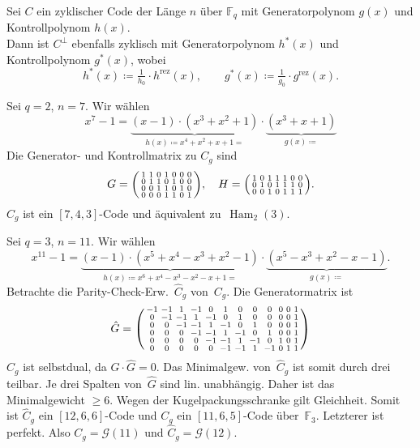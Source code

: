 \documentclass{cheat-sheet}
\newcommand{\F}{\mathbb{F}} %
\DeclareMathOperator{\Ham}{Ham} %
\newcommand{\Golay}{\mathcal{G}} %
\newcommand{\rez}{\mathrm{rez}} %
\begin{document}
\begin{satz}
  Sei $C$ ein zyklischer Code der Länge $n$ über $\F_q$ mit Generatorpolynom $g(x)$ und Kontrollpolynom $h(x)$. \\
  Dann ist $C^\perp$ ebenfalls zyklisch mit Generatorpolynom $h^*(x)$ und Kontrollpolynom $g^*(x)$, wobei
  \[
    h^*(x) \coloneqq \tfrac{1}{h_0} \cdot h^\rez(x), \qquad
    g^*(x) \coloneqq \tfrac{1}{g_0} \cdot g^\rez(x).
  \]
\end{satz}

\begin{bsp}
  Sei $q=2$, $n=7$.
  Wir wählen
  \[
    x^7 - 1 = \underbrace{(x-1) \cdot (x^3 + x^2 + 1)}_{h(x) \coloneqq x^4 + x^2 + x + 1 =} \cdot \underbrace{(x^3 + x + 1)}_{g(x) \coloneqq}
  \]
  Die Generator- und Kontrollmatrix zu $C_g$ sind
  \[
    G = \begin{psmallmatrix}
      1 & 1 & 0 & 1 & 0 & 0 & 0 \\
      0 & 1 & 1 & 0 & 1 & 0 & 0 \\
      0 & 0 & 1 & 1 & 0 & 1 & 0 \\
      0 & 0 & 0 & 1 & 1 & 0 & 1
    \end{psmallmatrix}, \quad
    H = \begin{psmallmatrix}
      1 & 0 & 1 & 1 & 1 & 0 & 0 \\
      0 & 1 & 0 & 1 & 1 & 1 & 0 \\
      0 & 0 & 1 & 0 & 1 & 1 & 1
    \end{psmallmatrix}.
  \]
  $C_g$ ist ein $[7, 4, 3]$-Code und äquivalent zu~$\Ham_2(3)$.
\end{bsp}

\begin{bsp}
  Sei $q = 3$, $n = 11$.
  Wir wählen
  \[
    x^{11} - 1 = \underbrace{(x-1) \cdot (x^5 + x^4 - x^3 + x^2 - 1)}_{h(x) \coloneqq x^6 + x^4 - x^3 - x^2 - x + 1 =} \cdot \underbrace{(x^5 - x^3 + x^2 - x - 1)}_{g(x) \coloneqq}.
  \]
  Betrachte die Parity-Check-Erw.~$\hat{C}_g$ von~$C_g$.
  Die Generatormatrix ist
  \[
    \setcounter{MaxMatrixCols}{20} %
    \hat{G} = \begin{psmallmatrix}
      -1 & -1 & 1 & -1 & 0 & 1 & 0 & 0 & 0 & 0 & 0 & 1 \\
      0 & -1 & -1 & 1 & -1 & 0 & 1 & 0 & 0 & 0 & 0 & 1 \\
      0 & 0 & -1 & -1 & 1 & -1 & 0 & 1 & 0 & 0 & 0 & 1 \\
      0 & 0 & 0 & -1 & -1 & 1 & -1 & 0 & 1 & 0 & 0 & 1 \\
      0 & 0 & 0 & 0 & -1 & -1 & 1 & -1 & 0 & 1 & 0 & 1 \\
      0 & 0 & 0 & 0 & 0 & -1 & -1 & 1 & -1 & 0 & 1 & 1
    \end{psmallmatrix}
  \]
  $\hat{C}_g$ ist selbstdual, da $\hat{G} \cdot \hat{G} = 0$.
  Das Minimalgew. von~$\hat{C}_g$ ist somit durch drei teilbar.
  Je drei Spalten von~$\hat{G}$ sind lin. unabhängig.
  Daher ist das Minimalgewicht $\geq 6$.
  Wegen der Kugelpackungsschranke gilt Gleichheit.
  Somit ist $\hat{C}_g$ ein $[12, 6, 6]$-Code und $C_g$ ein $[11, 6, 5]$-Code über~$\F_3$.
  Letzterer ist perfekt.
  Also $C_g = \Golay(11)$ und $\hat{C}_g = \Golay(12)$.
\end{bsp}
\end{document}
